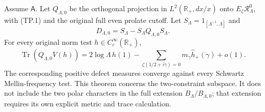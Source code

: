 \begin{theorem}
\label{AC-T44}
Assume \(\mathsf A\).  Let \(Q_{\Lambda,0}\) be the
orthogonal projection in \(L^2(\mathbb R_+,dx/x)\) onto
\(E_\zeta\mathcal R_\Lambda^0\), with (TP.1) and the
original full even prolate cutoff.
Let \(S_\Lambda=1_{[\Lambda^{-1},\Lambda]}\) and
\[
 D_{\Lambda,0}
       =S_\Lambda-S_\Lambda Q_{\Lambda,0}S_\Lambda .
 \tag{TP.18}
\]
For every original norm test
\(h\in C_c^\infty(\mathbb R_+)\),
\[
 \operatorname{Tr}(Q_{\Lambda,0}V(h))
       =2\log\Lambda\,h(1)
          -\sum_{\zeta(1/2+i\gamma)=0}
                    m_\gamma\widehat h_+(\gamma)+o(1).
 \tag{TP.19}
\]
The corresponding positive defect measures converge
against every Schwartz Mellin-frequency test.
This theorem concerns the two-constraint subspace.
It does not include the two polar characters in the full
extension \(B_\Lambda/B_{\Lambda,0}\); that extension
requires its own explicit metric and trace calculation.
\end{theorem}
